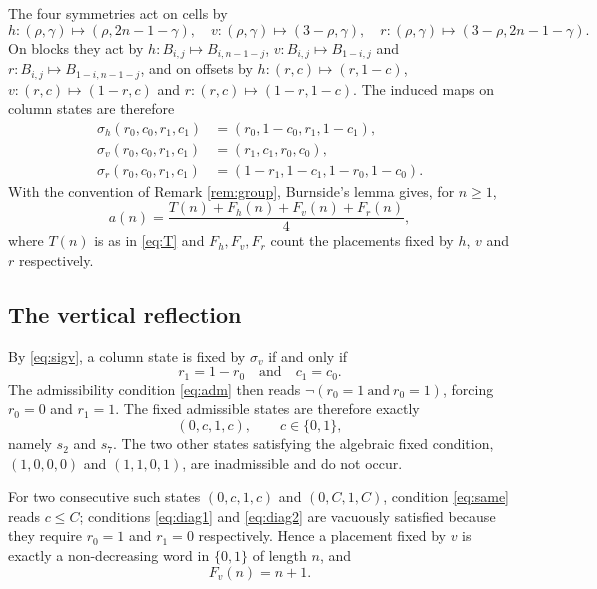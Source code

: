 \documentclass[12pt]{article}
\theoremstyle{definition}
\begin{document}
The four symmetries act on cells by
\[
h \colon (\rho, \gamma) \mapsto (\rho, 2n-1-\gamma), \quad
v \colon (\rho, \gamma) \mapsto (3-\rho, \gamma), \quad
r \colon (\rho, \gamma) \mapsto (3-\rho, 2n-1-\gamma).
\]
On blocks they act by $h \colon B_{i,j} \mapsto B_{i, n-1-j}$,
$v \colon B_{i,j} \mapsto B_{1-i, j}$ and $r \colon B_{i,j} \mapsto
B_{1-i, n-1-j}$, and on offsets by $h \colon (r,c) \mapsto (r, 1-c)$,
$v \colon (r,c) \mapsto (1-r, c)$ and $r \colon (r,c) \mapsto (1-r, 1-c)$. The
induced maps on column states are therefore
\begin{align}
\sigma_h (r_0,c_0,r_1,c_1) &= (r_0, 1-c_0, r_1, 1-c_1), \label{eq:sigh}\\
\sigma_v (r_0,c_0,r_1,c_1) &= (r_1, c_1, r_0, c_0), \label{eq:sigv}\\
\sigma_r (r_0,c_0,r_1,c_1) &= (1-r_1, 1-c_1, 1-r_0, 1-c_0). \label{eq:sigr}
\end{align}
With the convention of Remark \ref{rem:group}, Burnside's lemma gives, for
$n \ge 1$,
\begin{equation}
\label{eq:burnside}
a(n) = \frac{T(n) + F_h(n) + F_v(n) + F_r(n)}{4},
\end{equation}
where $T(n)$ is as in \eqref{eq:T} and $F_h, F_v, F_r$ count the placements
fixed by $h$, $v$ and $r$ respectively.

\subsection{The vertical reflection}

By \eqref{eq:sigv}, a column state is fixed by $\sigma_v$ if and only if
\[
r_1 = 1 - r_0 \quad \text{and} \quad c_1 = c_0 .
\]
The admissibility condition \eqref{eq:adm} then reads $\neg(r_0 = 1 \ \text{and}
\ r_0 = 1)$, forcing $r_0 = 0$ and $r_1 = 1$. The fixed admissible states are
therefore exactly
\[
(0,c,1,c), \qquad c \in \{0,1\},
\]
namely $s_2$ and $s_7$. The two other states satisfying the algebraic fixed
condition, $(1,0,0,0)$ and $(1,1,0,1)$, are inadmissible and do not occur.

For two consecutive such states $(0,c,1,c)$ and $(0,C,1,C)$, condition
\eqref{eq:same} reads $c \le C$; conditions \eqref{eq:diag1} and \eqref{eq:diag2}
are vacuously satisfied because they require $r_0 = 1$ and $r_1 = 0$
respectively. Hence a placement fixed by $v$ is exactly a non-decreasing word in
$\{0,1\}$ of length $n$, and
\begin{equation}
\label{eq:Fv}
F_v(n) = n + 1 .
\end{equation}
\end{document}
